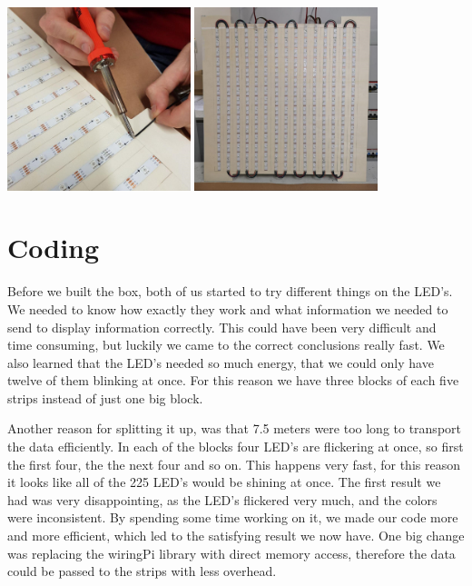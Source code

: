 \documentclass[a4paper,12pt]{article}
\begin{document}
{ \centering
  \includegraphics[width = 0.4\textwidth]{loten.jpg}
  \space{   }
  \includegraphics[width = 0.4\textwidth]{matrix.jpg}
  \\}
 \vspace{1cm}
 
\section{Coding}
Before we built the box, both of us started to try different things on the LED's.
 We needed to know how exactly they work and what information we needed to send to display information correctly.
 This could have been very difficult and time consuming, but luckily we came to the correct conclusions really fast.
 We also learned that  the LED's needed so much energy, that we could only have twelve of them blinking at once.
 For this reason we have three blocks of each five strips instead of just one big block.
 
 Another reason for splitting it up, was that 7.5 meters were too long to transport the data efficiently.
 In each of the blocks four LED's are flickering at once, so first the first four, the the next four and so on.
 This happens very fast, for this reason it looks like all of the 225 LED's would be shining at once.
 The first result we had was very disappointing, as the LED's flickered very much, and the colors were inconsistent.
 By spending some time working on it, we made our code more and more efficient, which led to the satisfying result we now have.
 One big change was replacing the wiringPi library with direct memory access, therefore the data could be passed to the strips with less overhead.
\end{document}
